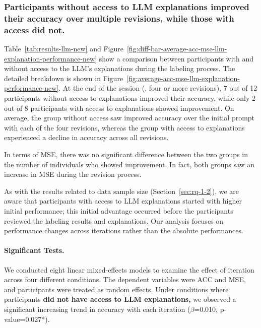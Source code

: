 \subsubsection{Participants without access to LLM explanations improved their accuracy over multiple revisions, while those with access did not.}
Table~\ref{tab:results-llm-new} and Figure~\ref{fig:diff-bar-average-acc-mse-llm-explanation-performance-new} show a comparison between participants with and without access to the LLM's explanations during the labeling process. The detailed breakdown is shown in Figure~\ref{fig:average-acc-mse-llm-explanation-performance-new}.
At the end of the session (\ie, four or more revisions),
7 out of 12 participants without access to explanations improved their accuracy, while only 2 out of 8 participants with access to explanations showed improvement.
On average, the group without access saw improved accuracy over the initial prompt with each of the four revisions, whereas the group with access to explanations experienced a decline in accuracy across all revisions.

In terms of MSE, there was no significant difference between the two groups in the number of individuals who showed improvement. 
In fact, both groups saw an increase in MSE during the revision process.

As with the results related to data sample size (Section~\ref{sec:rq-1-2}), we are aware that participants with access to LLM explanations started with higher initial performance; this initial advantage occurred before the participants reviewed the labeling results and explanations.
Our analysis focuses on performance changes across iterations rather than the absolute performances.

\paragraph{Significant Tests.}
We conducted eight linear mixed-effects models to examine the effect of iteration across four different conditions. 
The dependent variables were ACC and MSE, and participants were treated as random effects.
Under conditions where participants \textbf{did not have access to LLM explanations,} we observed a significant increasing trend in accuracy with each iteration ($\beta$=0.010, p-value=0.027*). 


